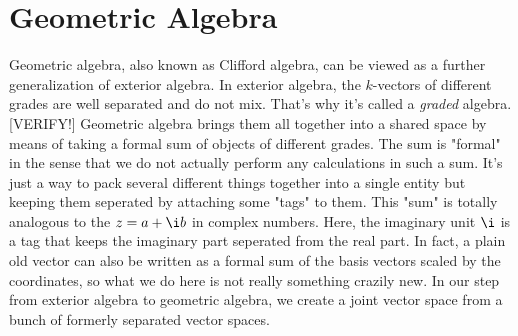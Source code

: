 \section{Geometric Algebra}
Geometric algebra, also known as Clifford algebra, can be viewed as a further generalization of exterior algebra. In exterior algebra, the $k$-vectors of different grades are well separated and do not mix. That's why it's called a \emph{graded} algebra. [VERIFY!] Geometric algebra brings them all together into a shared space by means of taking a formal sum of objects of different grades. The sum is "formal" in the sense that we do not actually perform any calculations in such a sum. It's just a way to pack several different things together into a single entity but keeping them seperated by attaching some "tags" to them. This "sum" is totally analogous to the $z = a + \i b$ in complex numbers. Here, the imaginary unit $\i$ is a tag that keeps the imaginary part seperated from the real part. In fact, a plain old vector can also be written as a formal sum of the basis vectors scaled by the coordinates, so what we do here is not really something crazily new. In our step from exterior algebra to geometric algebra, we create a joint vector space from a bunch of formerly separated vector spaces. 
